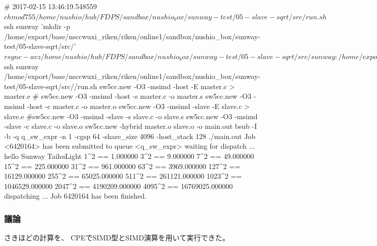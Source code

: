 \begin{code}
# 2017-02-15 13:46:19.548559
$ chmod 755 /home/nushio/hub/FDPS/sandbox/nushio_box/sunway-test/05-slave-sqrt/src/run.sh
$ ssh sunway 'mkdir -p /home/export/base/nsccwuxi_riken/riken/online1/sandbox/nushio_box/sunway-test/05-slave-sqrt/src/'
$ rsync -avz /home/nushio/hub/FDPS/sandbox/nushio_box/sunway-test/05-slave-sqrt/src/ sunway:/home/export/base/nsccwuxi_riken/riken/online1/sandbox/nushio_box/sunway-test/05-slave-sqrt/src/
sending incremental file list
run.sh

sent 173 bytes  received 40 bytes  28.40 bytes/sec
total size is 2,062  speedup is 9.68
$ ssh sunway /home/export/base/nsccwuxi_riken/riken/online1/sandbox/nushio_box/sunway-test/05-slave-sqrt/src//run.sh
sw5cc.new -O3 -msimd -host -E master.c > master.e
#	sw5cc.new -O3 -msimd -host -s master.c -o master.s
sw5cc.new -O3 -msimd -host -c master.c -o master.o
sw5cc.new -O3 -msimd -slave -E slave.c > slave.e
#sw5cc.new -O3 -msimd -slave -s slave.c -o slave.s
sw5cc.new -O3 -msimd -slave -c slave.c -o slave.o
sw5cc.new -hybrid  master.o slave.o -o main.out
bsub -I -b -q q_sw_expr -n 1 -cgsp 64 -share_size 4096 -host_stack 128 ./main.out
Job <6420164> has been submitted to queue <q_sw_expr>
waiting for dispatch ...
hello Sunway TaihuLight
1^2 == 1.000000
3^2 == 9.000000
7^2 == 49.000000
15^2 == 225.000000
31^2 == 961.000000
63^2 == 3969.000000
127^2 == 16129.000000
255^2 == 65025.000000
511^2 == 261121.000000
1023^2 == 1046529.000000
2047^2 == 4190209.000000
4095^2 == 16769025.000000
dispatching ...
Job 6420164 has been finished.

\end{code}

\subsubsection{議論}

 さきほどの計算を、
CPEでSIMD型とSIMD演算を用いて実行できた。


